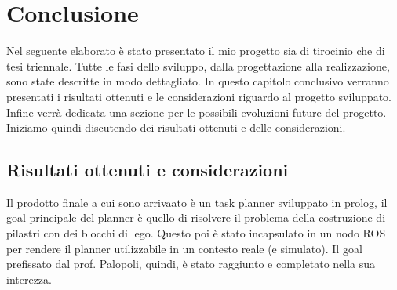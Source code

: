 \chapter{Conclusione}
\label{cha:conclusione}
Nel seguente elaborato è stato presentato il mio progetto sia di tirocinio che di tesi triennale. Tutte le fasi dello sviluppo, dalla progettazione alla realizzazione, sono state descritte in modo dettagliato.
In questo capitolo conclusivo verranno presentati i risultati ottenuti e le considerazioni riguardo al progetto sviluppato. Infine verrà dedicata una sezione per le possibili evoluzioni future del progetto.
Iniziamo quindi discutendo dei risultati ottenuti e delle considerazioni.

\section{Risultati ottenuti e considerazioni}
\label{sec:risultati}
Il prodotto finale a cui sono arrivaato è un task planner sviluppato in prolog, il goal principale del planner è quello di risolvere il problema della costruzione di pilastri con dei blocchi di lego.
Questo poi è stato incapsulato in un nodo ROS per rendere il planner utilizzabile in un contesto reale (e simulato). 
Il goal prefissato dal prof. Palopoli, quindi, è stato raggiunto e completato nella sua interezza.

